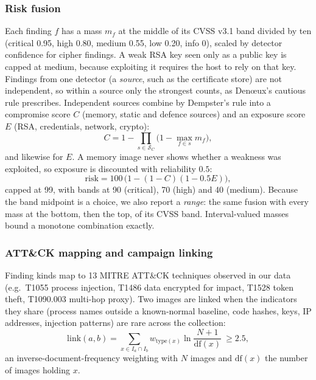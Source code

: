\subsubsection{Risk fusion}
Each finding $f$ has a mass $m_f$ at the middle of its CVSS v3.1 band divided by ten (critical
0.95, high 0.80, medium 0.55, low 0.20, info 0), scaled by detector confidence for cipher findings. A weak RSA
key seen only as a public key is capped at medium, because exploiting it requires the host to rely on that
key. Findings from one detector (a \emph{source}, such as the certificate store) are not independent, so
within a source only the strongest counts, as Den{\oe}ux's cautious rule prescribes.
Independent sources combine by Dempster's rule into a compromise score $C$ (memory, static and defence
sources) and an exposure score $E$ (RSA, credentials, network, crypto):
\begin{equation}
  C = 1 - \prod_{s \in \mathcal{S}_C}\Big(1 - \max_{f \in s} m_f\Big),
  \label{eq:fuse}
\end{equation}
and likewise for $E$. A memory image never shows whether a weakness was exploited, so exposure is discounted
with reliability $0.5$:
\begin{equation}
  \mathrm{risk} = 100\,\big(1 - (1-C)(1-0.5E)\big),
  \label{eq:risk}
\end{equation}
capped at 99, with bands at 90 (critical), 70 (high) and 40 (medium). Because the band midpoint is a choice,
we also report a \emph{range}: the same fusion with every mass at the bottom, then the top, of its CVSS band.
Interval-valued masses bound a monotone combination exactly.

\subsubsection{ATT\&CK mapping and campaign linking}
Finding kinds map to 13 MITRE ATT\&CK techniques observed in our data (e.g.\ T1055 process
injection, T1486 data encrypted for impact, T1528 token theft, T1090.003 multi-hop proxy). Two images are linked
when the indicators they share (process names outside a known-normal baseline, code hashes, keys, IP addresses,
injection patterns) are rare across the collection:
\begin{equation}
  \mathrm{link}(a,b) = \sum_{x \in I_a \cap I_b} w_{\mathrm{type}(x)} \ln\frac{N+1}{\mathrm{df}(x)} \ \ge 2.5,
\end{equation}
an inverse-document-frequency weighting with $N$ images and $\mathrm{df}(x)$ the number of
images holding $x$.

